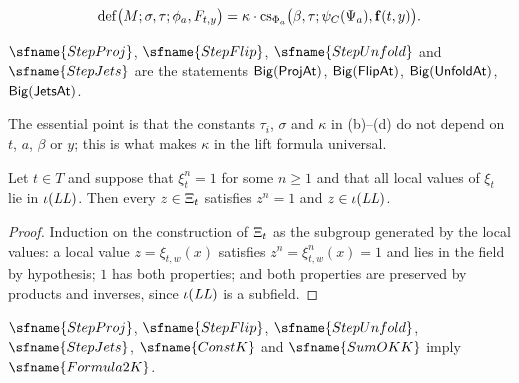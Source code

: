 \begin{definition}
\begin{enumerate}[label=(\alph*)]
\begin{equation}
\mathrm{def}\bigl(M;\sigma,\tau;\phi_a,F_{t,y}\bigr)=\kappa\cdot\mathrm{cs}_{\Phi_a}\bigl(\beta,\tau;\psi_C(\Psi_a),\mathbf{f}(t,y)\bigr).
\end{equation}
\end{enumerate}
$\sfname{StepProj}$, $\sfname{StepFlip}$, $\sfname{StepUnfold}$ and $\sfname{StepJets}$ are the statements
$\mathsf{Big}(\mathsf{ProjAt})$, $\mathsf{Big}(\mathsf{FlipAt})$, $\mathsf{Big}(\mathsf{UnfoldAt})$, $\mathsf{Big}(\mathsf{JetsAt})$.
\end{definition}

The essential point is that the constants $\tau_i$, $\sigma$ and $\kappa$ in (b)--(d) do not depend on $t$, $a$, $\beta$ or
$y$; this is what makes $\kappa$ in the lift formula universal.

\begin{lemma}\label{pf:rowprops:xivals}
Let $t\in T$ and suppose that $\xi_t^n=1$ for some $n\ge1$ and that all local values of $\xi_t$ lie in
$\iota(\mathit{LL})$. Then every $z\in\Xi_t$ satisfies $z^n=1$ and $z\in\iota(\mathit{LL})$.
\end{lemma}

\begin{proof}
Induction on the construction of $\Xi_t$ as the subgroup generated by the local values: a local value $z=\xi_{t,w}(x)$
satisfies $z^n=\xi^n_{t,w}(x)=1$ and lies in the field by hypothesis; $1$ has both properties; and both properties are
preserved by products and inverses, since $\iota(\mathit{LL})$ is a subfield.
\end{proof}

\begin{proposition}\label{pf:rowprops:formula2K}
$\sfname{StepProj}$, $\sfname{StepFlip}$, $\sfname{StepUnfold}$, $\sfname{StepJets}$, $\sfname{ConstK}$ and $\sfname{SumOKK}$
imply $\sfname{Formula2K}$.
\end{proposition}

